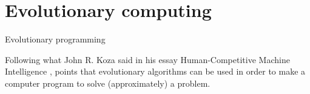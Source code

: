 \section*{Evolutionary computing}
\begin{frame}
  \begin{blur}
    \begin{center}
      {\LARGE Evolutionary programming}
    \end{center}
  \end{blur}
\end{frame}

\begin{frame}
  \begin{blur}

    Following what John R. Koza said in his essay Human-Competitive Machine
    Intelligence \cite{PEADNAS2003}, points that evolutionary algorithms can be
    used in order to make a computer program to solve (approximately)
    a problem.

  \end{blur}
\end{frame}

